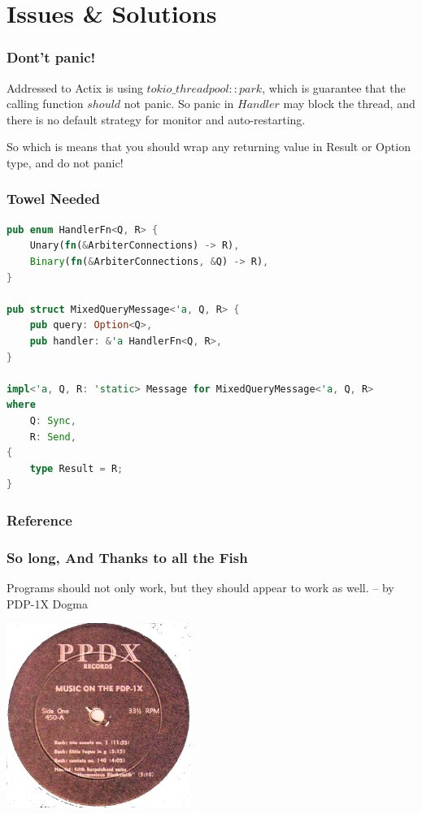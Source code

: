 \documentclass[notheorems, aspectratio=54]{beamer}
\begin{document}
\section{Issues \& Solutions}
\begin{frame}[fragile]
  \frametitle{Dont't panic!}

  Addressed to Actix is using $tokio\_threadpool::park$, which is guarantee that the calling function $should$ not panic. So panic in $Handler$ may block the thread, and there is no default strategy for monitor and auto-restarting.

  So which is means that you should wrap any returning value in Result or Option type, and do not panic!
\end{frame}

\begin{frame}[fragile]
  \frametitle{Towel Needed}

\begin{lstlisting}[language=Rust]
pub enum HandlerFn<Q, R> {
    Unary(fn(&ArbiterConnections) -> R),
    Binary(fn(&ArbiterConnections, &Q) -> R),
}

pub struct MixedQueryMessage<'a, Q, R> {
    pub query: Option<Q>,
    pub handler: &'a HandlerFn<Q, R>,
}

impl<'a, Q, R: 'static> Message for MixedQueryMessage<'a, Q, R>
where
    Q: Sync,
    R: Send,
{
    type Result = R;
}
\end{lstlisting}

\end{frame}

\begin{frame}[allowframebreaks]
    \frametitle{Reference}
  
  
\end{frame}
\begin{frame}
  \frametitle{So long, And Thanks to all the Fish}
  \begin{center}
    Programs should not only work, but they should appear to work as well.
    -- by PDP-1X Dogma
  \end{center}
  \begin{center}
    \includegraphics[height=6cm]{./maxresdefault.png}
  \end{center}
\end{frame}
\end{document}
